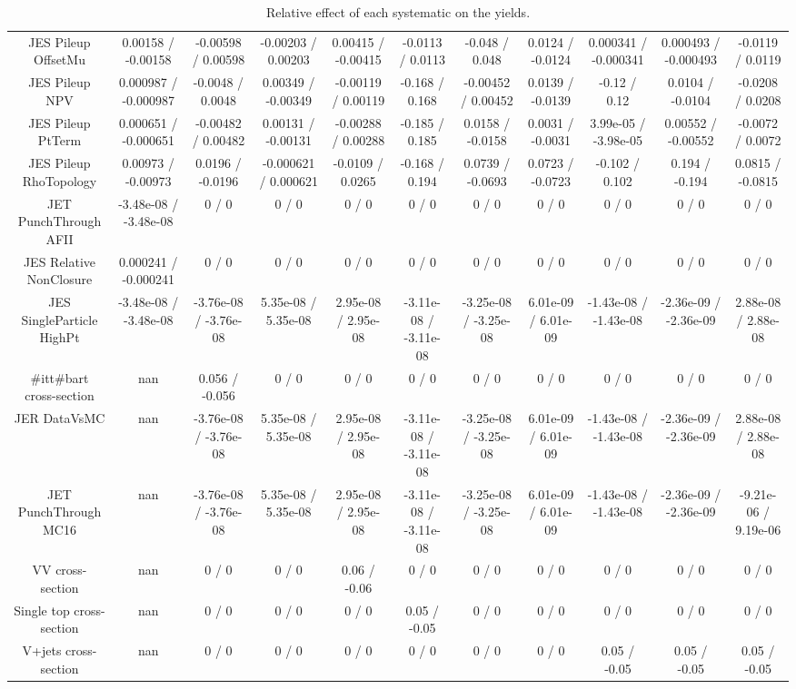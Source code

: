 \begin{table}[htbp]
\begin{center}
\begin{tabular}{|c|c|c|c|c|c|c|c|c|c|c|}
  JES Pileup OffsetMu & 0.00158 / -0.00158 & -0.00598 / 0.00598 & -0.00203 / 0.00203 & 0.00415 / -0.00415 & -0.0113 / 0.0113 & -0.048 / 0.048 & 0.0124 / -0.0124 & 0.000341 / -0.000341 & 0.000493 / -0.000493 & -0.0119 / 0.0119 \\ 
  JES Pileup NPV & 0.000987 / -0.000987 & -0.0048 / 0.0048 & 0.00349 / -0.00349 & -0.00119 / 0.00119 & -0.168 / 0.168 & -0.00452 / 0.00452 & 0.0139 / -0.0139 & -0.12 / 0.12 & 0.0104 / -0.0104 & -0.0208 / 0.0208 \\ 
  JES Pileup PtTerm & 0.000651 / -0.000651 & -0.00482 / 0.00482 & 0.00131 / -0.00131 & -0.00288 / 0.00288 & -0.185 / 0.185 & 0.0158 / -0.0158 & 0.0031 / -0.0031 & 3.99e-05 / -3.98e-05 & 0.00552 / -0.00552 & -0.0072 / 0.0072 \\ 
  JES Pileup RhoTopology & 0.00973 / -0.00973 & 0.0196 / -0.0196 & -0.000621 / 0.000621 & -0.0109 / 0.0265 & -0.168 / 0.194 & 0.0739 / -0.0693 & 0.0723 / -0.0723 & -0.102 / 0.102 & 0.194 / -0.194 & 0.0815 / -0.0815 \\ 
  JET PunchThrough AFII & -3.48e-08 / -3.48e-08 & 0 / 0 & 0 / 0 & 0 / 0 & 0 / 0 & 0 / 0 & 0 / 0 & 0 / 0 & 0 / 0 & 0 / 0 \\ 
  JES Relative NonClosure & 0.000241 / -0.000241 & 0 / 0 & 0 / 0 & 0 / 0 & 0 / 0 & 0 / 0 & 0 / 0 & 0 / 0 & 0 / 0 & 0 / 0 \\ 
  JES SingleParticle HighPt & -3.48e-08 / -3.48e-08 & -3.76e-08 / -3.76e-08 & 5.35e-08 / 5.35e-08 & 2.95e-08 / 2.95e-08 & -3.11e-08 / -3.11e-08 & -3.25e-08 / -3.25e-08 & 6.01e-09 / 6.01e-09 & -1.43e-08 / -1.43e-08 & -2.36e-09 / -2.36e-09 & 2.88e-08 / 2.88e-08 \\ 
  #it{t#bar{t}} cross-section &    nan    & 0.056 / -0.056 & 0 / 0 & 0 / 0 & 0 / 0 & 0 / 0 & 0 / 0 & 0 / 0 & 0 / 0 & 0 / 0 \\ 
  JER DataVsMC &    nan    & -3.76e-08 / -3.76e-08 & 5.35e-08 / 5.35e-08 & 2.95e-08 / 2.95e-08 & -3.11e-08 / -3.11e-08 & -3.25e-08 / -3.25e-08 & 6.01e-09 / 6.01e-09 & -1.43e-08 / -1.43e-08 & -2.36e-09 / -2.36e-09 & 2.88e-08 / 2.88e-08 \\ 
  JET PunchThrough MC16 &    nan    & -3.76e-08 / -3.76e-08 & 5.35e-08 / 5.35e-08 & 2.95e-08 / 2.95e-08 & -3.11e-08 / -3.11e-08 & -3.25e-08 / -3.25e-08 & 6.01e-09 / 6.01e-09 & -1.43e-08 / -1.43e-08 & -2.36e-09 / -2.36e-09 & -9.21e-06 / 9.19e-06 \\ 
  VV cross-section &    nan    & 0 / 0 & 0 / 0 & 0.06 / -0.06 & 0 / 0 & 0 / 0 & 0 / 0 & 0 / 0 & 0 / 0 & 0 / 0 \\ 
  Single top cross-section &    nan    & 0 / 0 & 0 / 0 & 0 / 0 & 0.05 / -0.05 & 0 / 0 & 0 / 0 & 0 / 0 & 0 / 0 & 0 / 0 \\ 
  V+jets cross-section &    nan    & 0 / 0 & 0 / 0 & 0 / 0 & 0 / 0 & 0 / 0 & 0 / 0 & 0.05 / -0.05 & 0.05 / -0.05 & 0.05 / -0.05 \\ 
\hline 
\end{tabular} 
\caption{Relative effect of each systematic on the yields.} 
\end{center} 
\end{table} 
